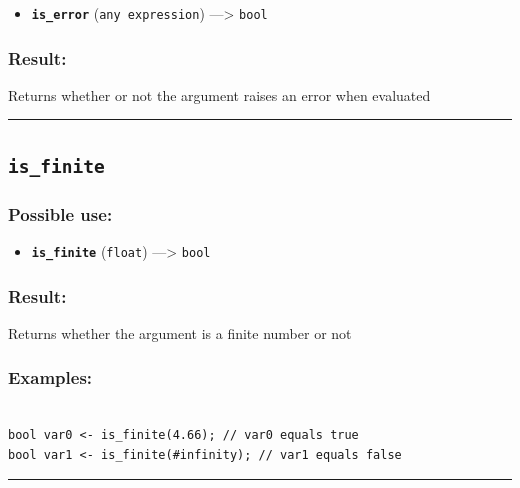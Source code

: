 \documentclass[]{book}
\providecommand{\tightlist}{%
  \setlength{\itemsep}{0pt}\setlength{\parskip}{0pt}}
\theoremstyle{definition}
\theoremstyle{definition}
\theoremstyle{definition}
\theoremstyle{remark}
\begin{document}
\begin{itemize}
\tightlist
\item
  \textbf{\texttt{is\_error}} (\texttt{any\ expression})
  ---\textgreater{} \texttt{bool}
\end{itemize}

\subsubsection{Result:}\label{result-277}

Returns whether or not the argument raises an error when evaluated

\begin{center}\rule{0.5\linewidth}{\linethickness}\end{center}

\subsection{\texorpdfstring{\texttt{is\_finite}}{is\_finite}}\label{is_finite}

\subsubsection{Possible use:}\label{possible-use-288}

\begin{itemize}
\tightlist
\item
  \textbf{\texttt{is\_finite}} (\texttt{float}) ---\textgreater{}
  \texttt{bool}
\end{itemize}

\subsubsection{Result:}\label{result-278}

Returns whether the argument is a finite number or not

\subsubsection{Examples:}\label{examples-215}

\begin{verbatim}
 
bool var0 <- is_finite(4.66); // var0 equals true 
bool var1 <- is_finite(#infinity); // var1 equals false
\end{verbatim}

\begin{center}\rule{0.5\linewidth}{\linethickness}\end{center}
\end{document}
